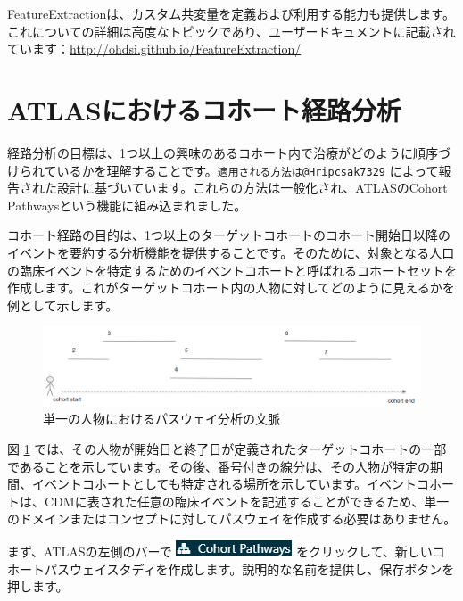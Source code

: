 \documentclass[
  11pt]{book}
\theoremstyle{definition}
\theoremstyle{definition}
\theoremstyle{definition}
\theoremstyle{definition}
\theoremstyle{remark}
\begin{document}
FeatureExtractionは、カスタム共変量を定義および利用する能力も提供します。これについての詳細は高度なトピックであり、ユーザードキュメントに記載されています：\url{http://ohdsi.github.io/FeatureExtraction/}

\section{ATLASにおけるコホート経路分析}\label{atlasux306bux304aux3051ux308bux30b3ux30dbux30fcux30c8ux7d4cux8defux5206ux6790}

経路分析の目標は、1つ以上の興味のあるコホート内で治療がどのように順序づけられているかを理解することです。\href{mailto:適用される方法は@Hripcsak7329}{\nolinkurl{適用される方法は@Hripcsak7329}} によって報告された設計に基づいています。これらの方法は一般化され、ATLASのCohort Pathwaysという機能に組み込まれました。

コホート経路の目的は、1つ以上のターゲットコホートのコホート開始日以降のイベントを要約する分析機能を提供することです。そのために、対象となる人口の臨床イベントを特定するためのイベントコホートと呼ばれるコホートセットを作成します。これがターゲットコホート内の人物に対してどのように見えるかを例として示します。

\begin{figure}

{\centering \includegraphics[width=1\linewidth]{images/Characterization/pathwaysPersonEventView} 

}

\caption{単一の人物におけるパスウェイ分析の文脈}\label{fig:pathwaysPersonEventView}
\end{figure}

図 \ref{fig:pathwaysPersonEventView} では、その人物が開始日と終了日が定義されたターゲットコホートの一部であることを示しています。その後、番号付きの線分は、その人物が特定の期間、イベントコホートとしても特定される場所を示しています。イベントコホートは、CDMに表された任意の臨床イベントを記述することができるため、単一のドメインまたはコンセプトに対してパスウェイを作成する必要はありません。

まず、ATLASの左側のバーで \includegraphics{images/Characterization/atlasPathwaysMenuItem.png} をクリックして、新しいコホートパスウェイスタディを作成します。説明的な名前を提供し、保存ボタンを押します。
\end{document}
